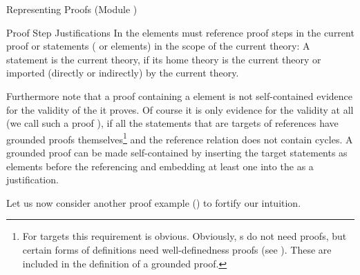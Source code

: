 \begin{tchapter}[id=proofs,short=Representing Proofs]{Representing Proofs (Module {})}
\begin{tsection}[id=proofs:justifications]{Proof Step Justifications}
In {\omdoc} the {} elements must reference proof steps in the current
proof or statements ({} or {} elements) in the scope of
the current theory: A statement is {} the current theory, if its home theory is the current theory or imported
(directly or indirectly) by the current theory.
  
Furthermore note that a proof containing a {} element is not
self-contained evidence for the validity of the {} it proves.
Of course it is only evidence for the validity at all (we call such a proof
{}), if all the statements that are targets of
{} references have grounded proofs themselves\footnote{For
  {} targets this requirement is obvious. Obviously,
  {s} do not need proofs, but certain forms of definitions need
  well-definedness proofs (see {}). These are included in
  the definition of a grounded proof.} and the reference relation does not contain
cycles. A grounded proof can be made self-contained by inserting the target
statements as {} elements before the referencing
{} and embedding at least one {} into the
{} as a justification.

Let us now consider another proof example ({}) to fortify our intuition.


\end{tsection}
\end{tchapter}
